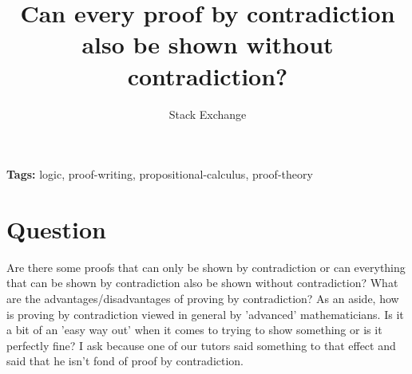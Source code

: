 \documentclass{article}
\title{Can every proof by contradiction also be shown without contradiction?}
\author{Stack Exchange}
\date{}
\begin{document}
\maketitle

\noindent\textbf{Tags:} logic, proof-writing, propositional-calculus, proof-theory

\section*{Question}
Are there some proofs that can only be shown by contradiction or can everything that can be shown by contradiction also be shown without contradiction? What are the advantages/disadvantages of proving by contradiction? As an aside, how is proving by contradiction viewed in general by 'advanced' mathematicians. Is it a bit of an 'easy way out' when it comes to trying to show something or is it perfectly fine? I ask because one of our tutors said something to that effect and said that he isn't fond of proof by contradiction.
\end{document}
